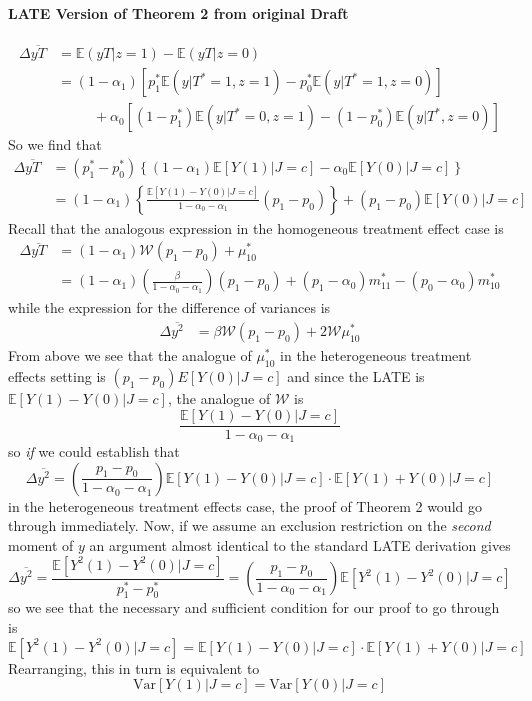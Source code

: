 \paragraph{LATE Version of Theorem 2 from original Draft}
\begin{align*}
  \Delta\overline{yT} &= \mathbb{E}\left( yT|z=1 \right) - \mathbb{E}\left( yT|z=0 \right) \\
  &= (1 - \alpha_1) \left[ p_1^* \mathbb{E}\left( y|T^*=1, z=1 \right) - p_0^* \mathbb{E}\left(y|T^*=1, z=0\right) \right] \\
  & \; \; \quad \quad + \alpha_0 \left[ (1 - p_1^*)\mathbb{E}\left( y|T^*=0, z=1\right) - (1 - p_0^*)\mathbb{E}\left(y|T^*,z=0 \right) \right]
\end{align*}
So we find that
\begin{align*}
  \Delta\overline{yT} &= (p_1^* - p_0^*)\left\{ (1 - \alpha_1) \mathbb{E}\left[ Y(1)|J=c \right] - \alpha_0\mathbb{E}\left[ Y(0)|J=c \right] \right\}\\
  &= (1 - \alpha_1) \left\{ \frac{\mathbb{E}\left[ Y(1) - Y(0)|J=c \right]}{1 - \alpha_0 - \alpha_1} (p_1 - p_0) \right\} + (p_1  - p_0) \mathbb{E}\left[ Y(0)|J=c \right]
\end{align*}
Recall that the analogous expression in the homogeneous treatment effect case is
\begin{align*}
  \Delta\overline{yT} &= (1 - \alpha_1) \mathcal{W} (p_1 - p_0) + \mu_{10}^*\\
  &= (1 - \alpha_1) \left(\frac{\beta}{1 - \alpha_0 - \alpha_1}\right) (p_1 - p_0) + (p_1 - \alpha_0)m_{11}^* - (p_0 - \alpha_0)m_{10}^*
\end{align*}
while the expression for the difference of variances is 
\begin{align*}
  \Delta\overline{y^2} &= \beta \mathcal{W}(p_1 - p_0) + 2\mathcal{W} \mu_{10}^*
\end{align*}
From above we see that the analogue of $\mu_{10}^*$ in the heterogeneous treatment effects setting is $(p_1 - p_0)E\left[ Y(0)|J=c \right]$ and since the LATE is $\mathbb{E}\left[ Y(1) - Y(0) |J=c\right]$, the analogue of $\mathcal{W}$ is
\[
  \frac{\mathbb{E}\left[ Y(1) - Y(0)|J=c \right]}{1 - \alpha_0 - \alpha_1}
\]
so \emph{if} we could establish that 
\[
  \Delta\overline{y^2} =  \left( \frac{p_1 - p_0}{1 - \alpha_0 - \alpha_1} \right)\mathbb{E}\left[ Y(1) - Y(0)|J=c \right]\cdot \mathbb{E}\left[ Y(1) + Y(0) |J=c \right]
\]
in the heterogeneous treatment effects case, the proof of Theorem 2 would go through immediately.
Now, if we assume an exclusion restriction on the \emph{second} moment of $y$ an argument almost identical to the standard LATE derivation gives
\[
  \Delta\overline{y^2} = \frac{\mathbb{E}\left[ Y^2(1) - Y^2(0) |J=c \right]}{p_1^* - p_0^*} = \left( \frac{p_1 - p_0}{1 - \alpha_0 - \alpha_1} \right)\mathbb{E}\left[ Y^2(1) - Y^2(0) |J=c \right] 
\]
so we see that the necessary and sufficient condition for our proof to go through is 
\[
  \mathbb{E}\left[ Y^2(1) - Y^2(0)|J=c \right] = \mathbb{E}\left[ Y(1) - Y(0)|J=c \right]\cdot \mathbb{E}\left[ Y(1) + Y(0)|J=c \right]
\]
Rearranging, this in turn is equivalent to
\[
  \mbox{Var}\left[ Y(1)|J=c \right] = \mbox{Var}\left[ Y(0)|J=c \right]
\]


